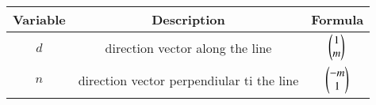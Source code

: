 \begin{center}
    \begin{tabular}{|c|c|c|} 
        \hline
            \textbf{Variable} & \textbf{Description} & \textbf{Formula} \\ 
        \hline
            $d$   & direction vector along the line & $\begin{pmatrix}1 \\ m\end{pmatrix}$ \\ 
        \hline
            $n$   & direction vector perpendiular ti the line &  $\begin{pmatrix}-m\\1\end{pmatrix}$\\ 
        \hline
            
        
    \end{tabular}
\end{center}  
